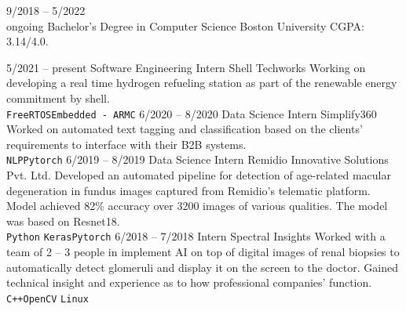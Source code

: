 \documentclass[9pt]{developercv} %
\begin{document}
\vspace{0.5cm}



\begin{entrylist}
  \entry
  {9/2018 -- 5/2022\\\footnotesize{ongoing}}
  {Bachelor's Degree in Computer Science}
  {Boston University}
  {CGPA: 3.14/4.0.}
\end{entrylist}



\begin{entrylist}
  \entry
  {5/2021 -- present}
  {Software Engineering Intern}
  {Shell Techworks}
  {Working on developing a real time hydrogen refueling station as part of the renewable energy commitment by shell.\\
    \texttt{FreeRTOS}\slashsep\texttt{Embedded - ARM}\slashsep\texttt{C}}
  \entry
  {6/2020 -- 8/2020}
  {Data Science Intern}
  {Simplify360}
  {Worked on automated text tagging and classification based on the clients' requirements to interface with their B2B systems. \\
    \texttt{NLP}\slashsep\texttt{Pytorch}}
  \entry
  {6/2019 -- 8/2019}
  {Data Science Intern}
  {Remidio Innovative Solutions Pvt. Ltd.}
  {Developed an automated pipeline for detection of age-related macular degeneration in fundus images captured from Remidio’s telematic platform. Model achieved 82\% accuracy over 3200 images of various qualities. The model was based on Resnet18.\\ \texttt{Python}
    \slashsep\texttt{Keras}\slashsep\texttt{Pytorch}}
  \entry
  {6/2018 -- 7/2018}
  {Intern}
  {Spectral Insights}
  {Worked with a team of 2 – 3 people in implement AI on top of digital images of renal biopsies to automatically detect glomeruli and display it on the screen to the doctor. Gained technical insight and experience as to how professional companies’ function. \\ \texttt{C++}\slashsep\texttt{OpenCV}
    \slashsep\texttt{Linux}}
  \end{entrylist}
\end{document}
